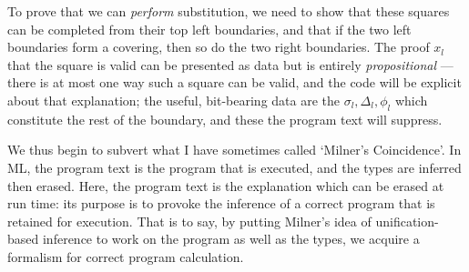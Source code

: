 \documentclass[orivec]{jfp}
\begin{document}
To prove that we can \emph{perform} substitution, we need to show that these squares can be completed from their top left boundaries, and that if the two left boundaries form a covering, then so do the two right boundaries. The proof $x_l$ that the square is valid can be presented as data but is entirely \emph{propositional} --- there is at most one way such a square can be valid, and the code will be explicit about that explanation; the useful, bit-bearing data are the $\sigma_l, \Delta_l, \phi_l$ which constitute the rest of the boundary, and these the program text will suppress.

We thus begin to subvert what I have sometimes called `Milner's Coincidence'. In ML, the program text is the program that is executed, and the types are inferred then erased. Here, the program text is the explanation which can be erased at run time: its purpose is to provoke the inference of a correct program that is retained for execution. That is to say, by putting Milner's idea of unification-based inference to work on the program as well as the types, we acquire a formalism for correct program calculation.
\end{document}
